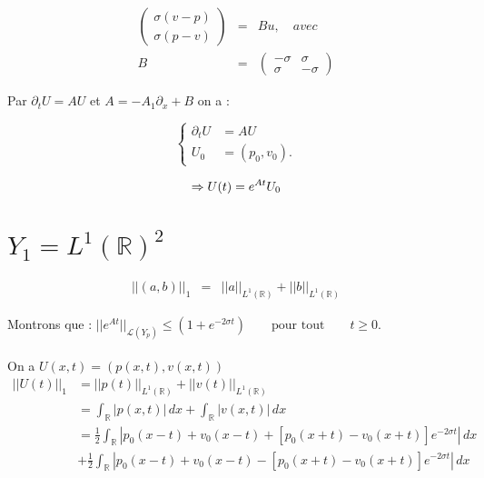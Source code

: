 \documentclass[a4paper,11pt]{article}
\begin{document}
\begin{equation*}
\begin{array}{rcl}
    \begin{pmatrix}
        \sigma(v-p) \\
        \sigma(p-v)
    \end{pmatrix} &=&
    Bu, \quad avec \\
    B &=&
    \begin{pmatrix}
        -\sigma & \sigma \\
        \sigma & -\sigma
    \end{pmatrix}
\end{array}
\end{equation*}

Par \( \partial_t U = AU \) et  \( A=-A_1\partial_x + B \) on a :

\begin{displaymath}
    \left\{
    \begin{array}{rl}
        \partial_t U &=AU\\
        U_0 &=(p_0,v_0).
        \end{array}
    \right.
\end{displaymath}

\begin{displaymath}
\Rightarrow \\
    U(t) = e^{At} U_{0}
\end{displaymath}

\section{\( Y_{1} = L^{1}(\mathbb{R})^{2} \)}

\begin{equation*}
\begin{array}{rcl}
    ||(a,b)||_{1} &=& ||a||_{L^{1}(\mathbb{R})} + ||b||_{L^{1}(\mathbb{R})}
\end{array}
\end{equation*}

Montrons que :
\( ||e^{At}||_{\mathcal{L}(Y_p)}\leq (1+e^{-2\sigma t}) \qquad \mbox{pour tout} \qquad t\geq 0. \)\\ \\
On a \( U(x,t)=(p(x,t),v(x,t)) \) \\

\begin{equation*}
\begin{split}
    ||U(t)||_1 &= ||p(t)||_{L^1(\mathbb{R})} + ||v(t)||_{L^1(\mathbb{R})} \\
    &= \int_{\mathbb{R}}{|p(x,t)|\,dx} + \int_{\mathbb{R}}{|v(x,t)|\,dx} \\
    &= \frac{1}{2} \int_{\mathbb{R}}|p_0(x-t)+v_0(x-t) + [p_0(x+t)-v_0(x+t)] e^{-2\sigma t} | \,dx \\
    & +\frac{1}{2} \int_{\mathbb{R}}|p_0(x-t)+v_0(x-t) - [p_0(x+t)-v_0(x+t)] e^{-2\sigma t} | \,dx
\end{split}
\end{equation*}
\end{document}
